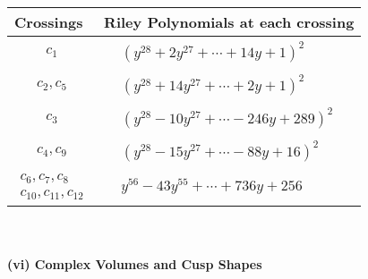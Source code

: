 \documentclass[1p]{elsarticle_modified}
\theoremstyle{definition}
\begin{document}
\begin{tabular}{m{50pt}|m{274pt}}
Crossings & \hspace{64pt}Riley Polynomials at each crossing \\
\hline $$\begin{aligned}c_{1}\end{aligned}$$&$\begin{aligned}
&(y^{28}+2 y^{27}+\cdots+14 y+1)^{2}
\end{aligned}$\\
\hline $$\begin{aligned}c_{2},c_{5}\end{aligned}$$&$\begin{aligned}
&(y^{28}+14 y^{27}+\cdots+2 y+1)^{2}
\end{aligned}$\\
\hline $$\begin{aligned}c_{3}\end{aligned}$$&$\begin{aligned}
&(y^{28}-10 y^{27}+\cdots-246 y+289)^{2}
\end{aligned}$\\
\hline $$\begin{aligned}c_{4},c_{9}\end{aligned}$$&$\begin{aligned}
&(y^{28}-15 y^{27}+\cdots-88 y+16)^{2}
\end{aligned}$\\
\hline $$\begin{aligned}c_{6},c_{7},c_{8}\\c_{10},c_{11},c_{12}\end{aligned}$$&$\begin{aligned}
&y^{56}-43 y^{55}+\cdots+736 y+256
\end{aligned}$\\
\hline
\end{tabular}\\~\\
\newpage\flushleft \textbf{(vi) Complex Volumes and Cusp Shapes}
\end{document}
